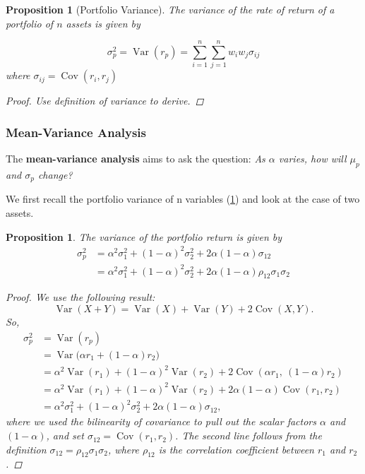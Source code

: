\documentclass[12pt, a4paper]{article}
\newcommand{\op}[1]{\operatorname{#1}}
\theoremstyle{plain}
\newtheorem{proposition}[theorem]{Proposition}
\theoremstyle{definition}
\theoremstyle{remark}
\newcounter{question}[section]
\begin{document}
\begin{proposition}[Portfolio Variance]\label{prop: port-var-n}
The variance of the rate of return of a portfolio of $n$ assets is given by

$$\sigma_p^2 = \op{Var}(r_p) = \sum_{i=1}^n\sum_{j=1}^n w_iw_j \sigma_{ij}$$ where $\sigma_{ij} = \op{Cov}(r_i, r_j)$

\begin{proof}
    Use definition of variance to derive.
\end{proof}
\end{proposition}


\subsubsection{Mean-Variance Analysis}

The \textbf{mean-variance analysis} aims to ask the question: \textit{As $\alpha$ varies, how will $\mu_p$ and $\sigma_p$ change?}

We first recall the portfolio variance of n variables (\ref{prop: port-var-n}) and look at the case of two assets.

\begin{proposition}
    The variance of the portfolio return is given by
    \begin{align*}
        \sigma_p^2 &= \alpha^2 \sigma_1^2 + (1-\alpha)^2 \sigma_2^2 +2 \alpha(1-\alpha) \sigma_{12}\\
        &= \alpha^2 \sigma_1^2 + (1-\alpha)^2 \sigma_2^2 +2 \alpha(1-\alpha) \rho_{12}\sigma_1\sigma_2
    \end{align*}
    \begin{proof}
    We use the following result:
    \[
        \operatorname{Var}(X+Y) = \operatorname{Var}(X) + \operatorname{Var}(Y) + 2\operatorname{Cov}(X,Y).
    \]
    So,
    \begin{align*}
        \sigma_p^2 &= \operatorname{Var}(r_p)\\
        &= \operatorname{Var}\big(\alpha r_1 + (1-\alpha)r_2\big)\\
        &= \alpha^2 \operatorname{Var}(r_1) + (1-\alpha)^2 \operatorname{Var}(r_2) 
           + 2\operatorname{Cov}(\alpha r_1,\ (1-\alpha) r_2)\\
        &= \alpha^2 \operatorname{Var}(r_1) + (1-\alpha)^2 \operatorname{Var}(r_2) 
           + 2\alpha(1-\alpha)\operatorname{Cov}(r_1, r_2)\\
        &= \alpha^2 \sigma_1^2 + (1-\alpha)^2 \sigma_2^2 + 2\alpha(1-\alpha)\sigma_{12},
    \end{align*}
    where we used the bilinearity of covariance to pull out the scalar factors 
    $\alpha$ and $(1-\alpha)$, and set $\sigma_{12} = \operatorname{Cov}(r_1, r_2)$.
    The second line follows from the definition $\sigma_{12} = \rho_{12}\sigma_1\sigma_2$,
    where $\rho_{12}$ is the correlation coefficient between $r_1$ and $r_2$.
    \end{proof}
\end{proposition}
\end{document}
